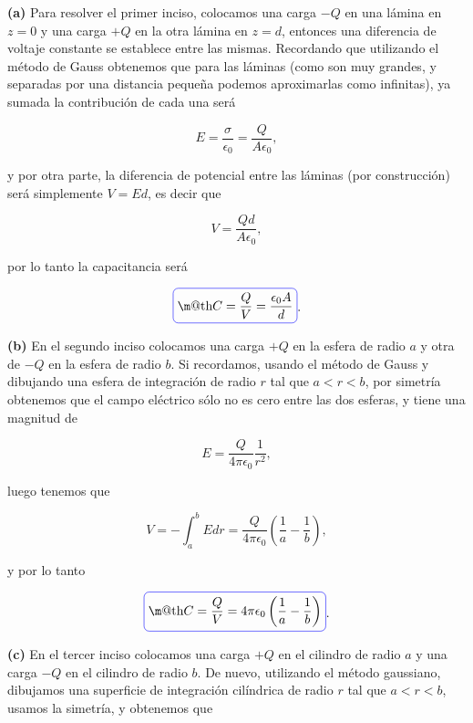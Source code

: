 \documentclass[a4paper,11pt]{article}
\makeatletter
\numberwithin{equation}{section}
\newcommand*{\boxcolor}{blue}
\renewcommand{\boxed}[1]{\textcolor{\boxcolor}{%
\tikz[baseline={([yshift=-1ex]current bounding box.center)}] \node [rectangle, minimum width=1ex,rounded corners,draw] {\normalcolor\m@th$\displaystyle#1$};}}
\makeatother
\begin{document}
\textbf{(a)} Para resolver el primer inciso, colocamos una carga $-Q$ en una lámina 
en $z=0$ y una carga $+Q$ en la otra lámina en $z=d$, entonces una diferencia de 
voltaje constante se establece entre las mismas. Recordando que utilizando el método 
de Gauss obtenemos que para las láminas (como son muy grandes, y separadas por una 
distancia pequeña podemos aproximarlas como infinitas), ya sumada la contribución de 
cada una será 

\begin{equation}
 E = \frac{\sigma}{\epsilon_0} = \frac{Q}{A\epsilon_0},
\end{equation}

y por otra parte, la diferencia de potencial entre las láminas (por construcción) 
será simplemente $V = Ed$, es decir que 

\begin{equation}
 V = \frac{Qd}{A\epsilon_0},
\end{equation}

por lo tanto la capacitancia será 

\begin{equation}
 \boxed{C = \frac{Q}{V} = \frac{\epsilon_0 A}{d}}.
\end{equation}

\textbf{(b)} En el segundo inciso colocamos una carga $+Q$ en la esfera de 
radio $a$ y otra de $-Q$ en la esfera de radio $b$. Si recordamos, usando el método 
de Gauss y dibujando una esfera de integración de radio $r$ tal que $a < r < b$, 
por simetría obtenemos que el campo eléctrico sólo no es cero entre las dos 
esferas, y tiene una magnitud de 

\begin{equation}
 E = \frac{Q}{4\pi\epsilon_0}\frac{1}{r^2},
\end{equation}

luego tenemos que 

\begin{equation}
 V = - \int_a^b E dr = \frac{Q}{4\pi\epsilon_0}\left(\frac{1}{a} - \frac{1}{b}\right),
\end{equation}

y por lo tanto 

\begin{equation}
 \boxed{C = \frac{Q}{V} = 4\pi\epsilon_0\left(\frac{1}{a} - \frac{1}{b}\right)}.
\end{equation}

\textbf{(c)} En el tercer inciso colocamos una carga $+Q$ en el cilindro de radio 
$a$ y una carga $-Q$ en el cilindro de radio $b$. De nuevo, utilizando el método 
gaussiano, dibujamos una superficie de integración cilíndrica de radio $r$ tal que 
$a < r < b$, usamos la simetría, y obtenemos que 
\end{document}
